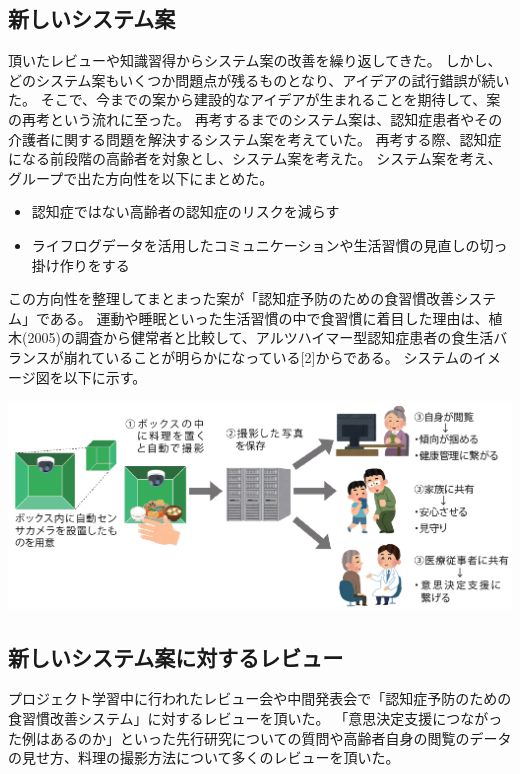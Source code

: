 \documentclass[../report]{subfiles}
\begin{document}
\subsection{新しいシステム案}
頂いたレビューや知識習得からシステム案の改善を繰り返してきた。
しかし、どのシステム案もいくつか問題点が残るものとなり、アイデアの試行錯誤が続いた。
そこで、今までの案から建設的なアイデアが生まれることを期待して、案の再考という流れに至った。
再考するまでのシステム案は、認知症患者やその介護者に関する問題を解決するシステム案を考えていた。
再考する際、認知症になる前段階の高齢者を対象とし、システム案を考えた。
システム案を考え、グループで出た方向性を以下にまとめた。
\begin{itemize}
    \item 認知症ではない高齢者の認知症のリスクを減らす
    \item ライフログデータを活用したコミュニケーションや生活習慣の見直しの切っ掛け作りをする
\end{itemize}
この方向性を整理してまとまった案が「認知症予防のための食習慣改善システム」である。
運動や睡眠といった生活習慣の中で食習慣に着目した理由は、植木(2005)の調査から健常者と比較して、アルツハイマー型認知症患者の食生活バランスが崩れていることが明らかになっている[2]からである。
システムのイメージ図を以下に示す。
\begin{center}
    \includegraphics[width=15cm]{imgs/system-overview.png}
\end{center}

\subsection{新しいシステム案に対するレビュー}
プロジェクト学習中に行われたレビュー会や中間発表会で「認知症予防のための食習慣改善システム」に対するレビューを頂いた。
「意思決定支援につながった例はあるのか」といった先行研究についての質問や高齢者自身の閲覧のデータの見せ方、料理の撮影方法について多くのレビューを頂いた。
\end{document}
